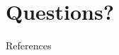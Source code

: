 \documentclass[newPxFont,pagenumber]{beamer}
\begin{document}
\section{Questions?}

%
%

\begin{frame}[t,allowframebreaks]{References}
\tiny

	
\end{frame}
\end{document}
